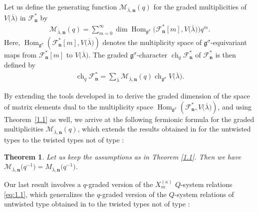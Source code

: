 \documentclass[10pt,a4paper]{amsart}
\numberwithin{equation}{section}
\newtheorem{Theorem}{Theorem}[section]
\DeclareMathOperator{\Hom}{Hom}
\DeclareMathOperator{\ch}{ch}
\begin{document}
Let us define the generating function $\mathcal{M}_{\overline{\lambda},\mathbf{n}}(q)$ for the graded multiplicities of $V\bigl(\overline{\lambda}\bigr)$ in $\mathcal{F}_{\mathbf{n}}^*$ by
\begin{gather}
\mathcal{M}_{\overline{\lambda},\mathbf{n}}(q)=\sum_{m=0}^{\infty}\dim\Hom_{\mathfrak{g}^{\sigma}}\bigl(\mathcal{F}_{\mathbf{n}}^*[m],V\bigl(\overline{\lambda}\bigr)\bigr)q^m.\label{eq:1.8}
\end{gather}
Here, $\Hom_{\mathfrak{g}^{\sigma}}(\mathcal{F}_{\mathbf{n}}^*[m],V\bigl(\overline{\lambda}\bigr))$ denotes the multiplicity space of $\mathfrak{g}^{\sigma}$-equivariant maps from $\mathcal{F}_{\mathbf{n}}^*[m]$ to $V\bigl(\overline{\lambda}\bigr)$. The graded $\mathfrak{g}^{\sigma}$-character $\ch_q \mathcal{F}_{\mathbf{n}}^*$ of $\mathcal{F}_{\mathbf{n}}^*$ is then defined by
\begin{gather*}
\ch_q \mathcal{F}_{\mathbf{n}}^*= \sum_{\overline{\lambda}}\mathcal{M}_{\overline{\lambda},\mathbf{n}}(q)\ch_{\mathfrak{g}^{\sigma}}V\bigl(\overline{\lambda}\bigr).
\end{gather*}

By extending the tools developed in \cite{AK07} to derive the graded dimension of the space of matrix elements dual to the multiplicity space $\Hom_{\mathfrak{g}^{\sigma}}(\mathcal{F}_{\mathbf{n}}^*,V\bigl(\overline{\lambda}\bigr))$, and using Theorem~\ref{1.1} as well, we arrive at the following fermionic formula for the graded multiplicities $\mathcal{M}_{\overline{\lambda},\mathbf{n}}(q)$, which extends the results obtained in \cite{AK07,DFK08} for the untwisted types to the twisted types not of type :

\begin{Theorem}\label{1.2}
Let us keep the assumptions as in Theorem {\rm\ref{1.1}}. Then we have
$
\mathcal{M}_{\overline{\lambda},\mathbf{n}}\bigl(q^{-1}\bigr)=M_{\overline{\lambda},\mathbf{n}}\bigl(q^{-1}\bigr)$.
\end{Theorem}

Our last result involves a $q$-graded version of the $X_m^{(\kappa)}$ $Q$-system relations \eqref{eq:1.1}, which generalizes the $q$-graded version of the $Q$-system relations of untwisted type obtained in \cite[Theorem~1.3]{Lin21} to the twisted types not of type :
\end{document}
